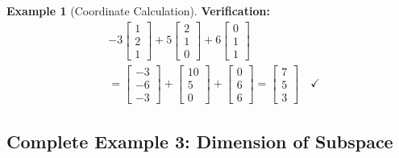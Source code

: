 \documentclass[12pt,a4paper]{article}
\theoremstyle{definition}
\newtheorem{example}{Example}[section]
\begin{document}
\begin{example}[Coordinate Calculation]
\textbf{Verification:}
\begin{align}
&-3\begin{bmatrix} 1 \\ 2 \\ 1 \end{bmatrix} + 5\begin{bmatrix} 2 \\ 1 \\ 0 \end{bmatrix} + 6\begin{bmatrix} 0 \\ 1 \\ 1 \end{bmatrix} \\
&= \begin{bmatrix} -3 \\ -6 \\ -3 \end{bmatrix} + \begin{bmatrix} 10 \\ 5 \\ 0 \end{bmatrix} + \begin{bmatrix} 0 \\ 6 \\ 6 \end{bmatrix} = \begin{bmatrix} 7 \\ 5 \\ 3 \end{bmatrix} \quad ✓
\end{align}
\end{example}

\subsection{Complete Example 3: Dimension of Subspace}
\end{document}
